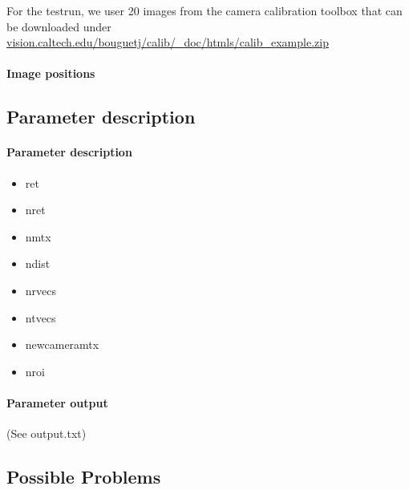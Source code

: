\documentclass{scrartcl}
\begin{document}
For the testrun, we user 20 images from the camera calibration toolbox that can be downloaded under \href{http://www.vision.caltech.edu/bouguetj/calib_doc/htmls/calib_example.zip}{vision.caltech.edu/bouguetj/calib/\_doc/htmls/calib\_example.zip}

\paragraph{Image positions}


\subsection{Parameter description}

\paragraph{Parameter description}
\begin{itemize}
\item ret\\
\item nret\\
\item nmtx\\
\item ndist\\
\item nrvecs\\
\item ntvecs\\
\item newcameramtx\\
\item nroi\\
\end{itemize}

\paragraph{Parameter output}
(See output.txt)


\subsection{Possible Problems}
\end{document}
